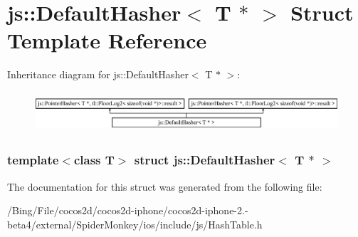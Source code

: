 \hypertarget{structjs_1_1_default_hasher_3_01_t_01_5_01_4}{\section{js\-:\-:Default\-Hasher$<$ T $\ast$ $>$ Struct Template Reference}
\label{structjs_1_1_default_hasher_3_01_t_01_5_01_4}
}
Inheritance diagram for js\-:\-:Default\-Hasher$<$ T $\ast$ $>$\-:\begin{figure}[H]
\begin{center}
\leavevmode
\includegraphics[height=1.509434cm]{structjs_1_1_default_hasher_3_01_t_01_5_01_4}
\end{center}
\end{figure}
\subsubsection*{template$<$class T$>$ struct js\-::\-Default\-Hasher$<$ T $\ast$ $>$}



The documentation for this struct was generated from the following file\-:\begin{DoxyCompactItemize}
\item 
/\-Bing/\-File/cocos2d/cocos2d-\/iphone/cocos2d-\/iphone-\/2.-\/beta4/external/\-Spider\-Monkey/ios/include/js/Hash\-Table.\-h\end{DoxyCompactItemize}
